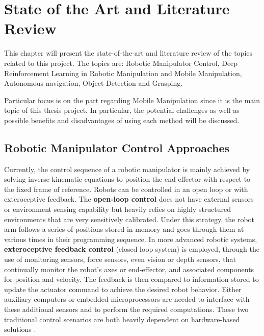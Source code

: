 
\chapter{State of the Art and Literature Review}

This chapter will present the state-of-the-art and literature review of the topics related to this project.
The topics are: Robotic Manipulator Control, Deep Reinforcement Learning in Robotic Manipulation and Mobile
Manipulation, Autonomous navigation, Object Detection and Grasping.

Particular focus is on the part regarding Mobile Manipulation since it is the main topic of
this thesis project. In particular, the potential challenges as well as possible
benefits and disadvantages of using each method will be discussed.

\section{Robotic Manipulator Control Approaches}

Currently, the control sequence of a robotic manipulator is mainly achieved by solving
inverse kinematic equations to position the end effector with respect to the
fixed frame of reference. Robots can be controlled in an open loop or with
exteroceptive feedback. The \textbf{open-loop control} does not have external sensors or
environment sensing capability but heavily relies on highly structured environments
that are very sensitively calibrated. Under this strategy, the robot arm follows a series of positions
stored in memory and goes through them at various times in their programming sequence.
In more advanced robotic systems, \textbf{exteroceptive feedback
	control} (closed loop system) is employed, through the use of monitoring sensors, force sensors,
even vision or depth sensors, that continually monitor the robot's axes or end-effector, and
associated components for position and velocity. The feedback is then compared to information
stored to update the actuator command to achieve the desired robot behavior. Either
auxiliary computers or embedded microprocessors are needed to interface with
these additional sensors and to perform the required computations. These two traditional
control scenarios are both heavily dependent on hardware-based solutions \cite{liu2021deep}.

